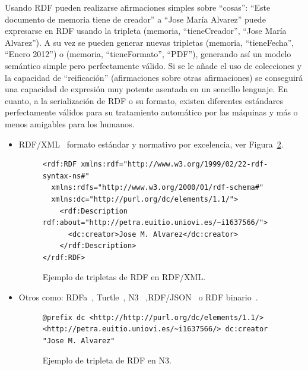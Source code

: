 Usando RDF pueden realizarse afirmaciones simples sobre ``cosas'': ``Este
documento de memoria tiene de creador'' a ``Jose María Alvarez'' puede expresarse en
RDF usando la tripleta (memoria, ``tieneCreador'', ``Jose María Alvarez''). 
A su vez  se pueden generar nuevas tripletas (memoria, ``tieneFecha'',
``Enero 2012'') o (memoria, ``tieneFormato'', ``PDF''), generando así un
modelo semántico simple pero perfectamente válido. Si se le añade el uso de colecciones y 
la capacidad de ``reificación'' (afirmaciones sobre otras
afirmaciones) se conseguirá una capacidad de expresión muy potente asentada en un
sencillo lenguaje. En cuanto, a la serialización de RDF o su formato, existen diferentes estándares perfectamente válidos para su tratamiento automático por las máquinas y más o
menos amigables para los humanos. 
\begin{itemize}
  \item \gls{RDF/XML}~\cite{rdf-syntax} formato estándar y normativo por excelencia, ver Figura~\ref{fig:rdf-n3}. 
\begin{figure}[!htbp]
\centering
  \begin{lstlisting} 
<rdf:RDF xmlns:rdf="http://www.w3.org/1999/02/22-rdf-syntax-ns#"
  xmlns:rdfs="http://www.w3.org/2000/01/rdf-schema#"
  xmlns:dc="http://purl.org/dc/elements/1.1/">
    <rdf:Description rdf:about="http://petra.euitio.uniovi.es/~i1637566/">
      <dc:creator>Jose M. Alvarez</dc:creator>
    </rdf:Description>
</rdf:RDF>  
  \end{lstlisting} 
\caption{Ejemplo de tripletas de RDF en RDF/XML.}
\label{fig:rdf-n3}
\end{figure}  

\item Otros como: \gls{RDFa}~\cite{rdfa-primer}, \gls{Turtle}~\cite{turtle-syntax}, \gls{N3}~\cite{n3-syntax} ,\gls{RDF}/\gls{JSON}~\cite{rdf-json} o RDF binario~\cite{rdf-binario}.   
\begin{figure}[!htbp]
\centering
  \begin{lstlisting} 
@prefix dc <http://http://purl.org/dc/elements/1.1/>
<http://petra.euitio.uniovi.es/~i1637566/> dc:creator "Jose M. Alvarez"
  \end{lstlisting}
\caption{Ejemplo de tripleta de RDF en N3.}
\label{fig:rdf-n3}
\end{figure}


 \end{itemize}

